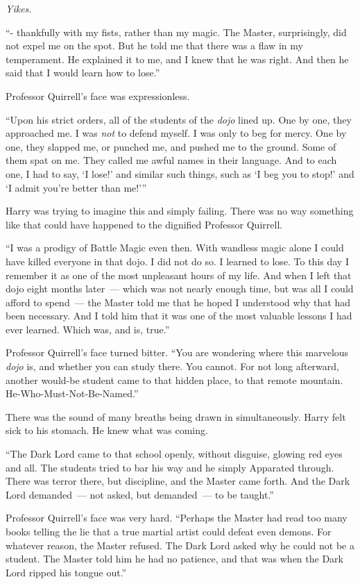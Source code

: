 \emph{Yikes.}

``- thankfully with my fists, rather than my magic. The Master, surprisingly, did not expel me on the spot. But he told me that there was a flaw in my temperament. He explained it to me, and I knew that he was right. And then he said that I would learn how to lose.''

Professor Quirrell's face was expressionless.

``Upon his strict orders, all of the students of the \emph{dojo} lined up. One by one, they approached me. I was \emph{not} to defend myself. I was only to beg for mercy. One by one, they slapped me, or punched me, and pushed me to the ground. Some of them spat on me. They called me awful names in their language. And to each one, I had to say, `I lose!' and similar such things, such as `I beg you to stop!' and `I admit you're better than me!'''

Harry was trying to imagine this and simply failing. There was no way something like that could have happened to the dignified Professor Quirrell.

``I was a prodigy of Battle Magic even then. With wandless magic alone I could have killed everyone in that dojo. I did not do so. I learned to lose. To this day I remember it as one of the most unpleasant hours of my life. And when I left that dojo eight months later~--- which was not nearly enough time, but was all I could afford to spend~--- the Master told me that he hoped I understood why that had been necessary. And I told him that it was one of the most valuable lessons I had ever learned. Which was, and is, true.''

Professor Quirrell's face turned bitter. ``You are wondering where this marvelous \emph{dojo} is, and whether you can study there. You cannot. For not long afterward, another would-be student came to that hidden place, to that remote mountain. He-Who-Must-Not-Be-Named.''

There was the sound of many breaths being drawn in simultaneously. Harry felt sick to his stomach. He knew what was coming.

``The Dark Lord came to that school openly, without disguise, glowing red eyes and all. The students tried to bar his way and he simply Apparated through. There was terror there, but discipline, and the Master came forth. And the Dark Lord demanded~--- not asked, but demanded~--- to be taught.''

Professor Quirrell's face was very hard. ``Perhaps the Master had read too many books telling the lie that a true martial artist could defeat even demons. For whatever reason, the Master refused. The Dark Lord asked why he could not be a student. The Master told him he had no patience, and that was when the Dark Lord ripped his tongue out.''

